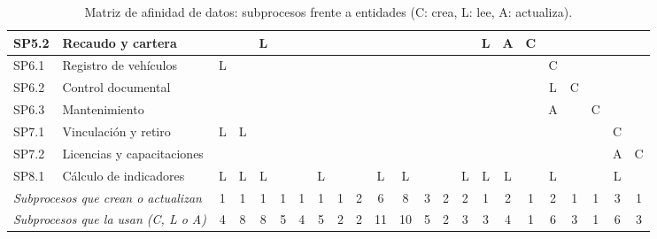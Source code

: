 \begin{landscape}
{\begin{table}[p]
\begin{tabular}{l l |c c |c c c c c |c c c c c c c |c c |c c c |c c}
SP5.2 & Recaudo y cartera &  &  & L &  &  &  &  &  &  &  &  &  &  & L & A & C &  &  &  &  &  \\
\midrule
SP6.1 & Registro de vehículos & L &  &  &  &  &  &  &  &  &  &  &  &  &  &  &  & C &  &  &  &  \\
SP6.2 & Control documental &  &  &  &  &  &  &  &  &  &  &  &  &  &  &  &  & L & C &  &  &  \\
SP6.3 & Mantenimiento &  &  &  &  &  &  &  &  &  &  &  &  &  &  &  &  & A &  & C &  &  \\
\midrule
SP7.1 & Vinculación y retiro & L & L &  &  &  &  &  &  &  &  &  &  &  &  &  &  &  &  &  & C &  \\
SP7.2 & Licencias y capacitaciones &  &  &  &  &  &  &  &  &  &  &  &  &  &  &  &  &  &  &  & A & C \\
\midrule
SP8.1 & Cálculo de indicadores & L & L & L &  &  & L &  &  & L & L &  &  & L & L & L &  & L &  &  & L &  \\
\midrule
\multicolumn{2}{l}{\textit{Subprocesos que crean o actualizan}} & 1 & 1 & 1 & 1 & 1 & 1 & 1 & 2 & 6 & 8 & 3 & 2 & 2 & 1 & 2 & 1 & 2 & 1 & 1 & 3 & 1 \\
\multicolumn{2}{l}{\textit{Subprocesos que la usan (C, L o A)}} & 4 & 8 & 8 & 5 & 4 & 5 & 2 & 2 & 11 & 10 & 5 & 2 & 3 & 3 & 4 & 1 & 6 & 3 & 1 & 6 & 3 \\
\bottomrule
\end{tabular}
\caption{Matriz de afinidad de datos: subprocesos frente a entidades (C: crea, L: lee, A: actualiza).}
\label{tab:matrizafinidad}
\end{table}
\par}
\end{landscape}
